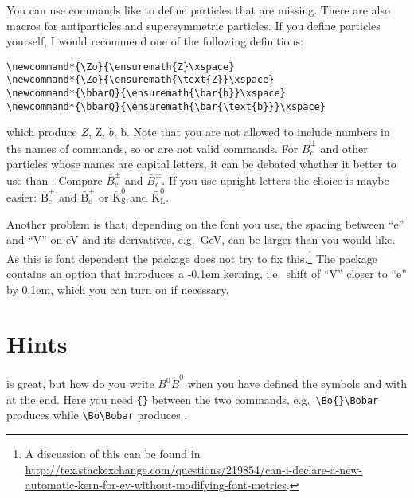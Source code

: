 You can use commands like  to define particles that are missing.
There are also macros for antiparticles and supersymmetric particles.
If you define particles yourself,
I would recommend one of the following definitions:
\begin{verbatim}
\newcommand*{\Zo}{\ensuremath{Z}\xspace}
\newcommand*{\Zo}{\ensuremath{\text{Z}}\xspace}
\newcommand*{\bbarQ}{\ensuremath{\bar{b}}\xspace}
\newcommand*{\bbarQ}{\ensuremath{\bar{\text{b}}}\xspace}
\end{verbatim}%
which produce \ensuremath{Z}, \ensuremath{\text{Z}},
\ensuremath{\bar{b}}, \ensuremath{\bar{\text{b}}}. Note that you are
not allowed to include numbers in the names of commands, so
 or  are not valid commands. For
$\overline{B}^{\pm}_{c}$ and other particles whose names are capital
letters, it can be debated whether it better to use
 than
. Compare $\overline{B}^{\pm}_{c}$ and
$\bar{B}^{\pm}_{c}$. If you use upright letters the choice is maybe
easier: $\overline{\text{B}}^{\pm}_{\text{c}}$ and
$\bar{\text{B}}^{\pm}_{\text{c}}$ or
$\overline{\text{K}}^{0}_{\text{S}}$ and
$\bar{\text{K}}^{0}_{\text{L}}$.

Another problem is that, depending on the font you use, the spacing between \enquote{e} and \enquote{V}
on \si{\eV} and its derivatives, e.g.\ \si{\GeV}, can be larger than you would like.
As this is font dependent the  package does not try to fix this.\footnote{%
A discussion of this can be found in
\url{http://tex.stackexchange.com/questions/219854/can-i-declare-a-new-automatic-kern-for-ev-without-modifying-font-metrics}.}
The  package contains an option  that introduces a -0.1em kerning,
i.e.\ shift of \enquote{V} closer to \enquote{e} by 0.1em, which you can turn on if necessary.


\section{Hints}%
\label{sec:tips:hints}

 is great, but how do you write $B^{0}\bar{B}^{0}$ when
you have defined the symbols  and  with
 at the end. Here you need \verb+{}+ between the two
commands, e.g.\ \verb+\Bo{}\Bobar+ produces \Bo{}\Bobar while
\verb+\Bo\Bobar+ produces \Bo\Bobar.

